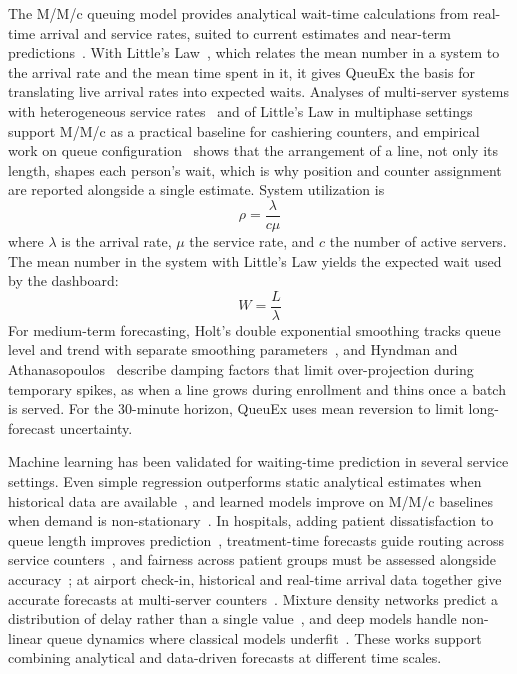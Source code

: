 \documentclass{research}
\newcommand{\sysname}{QueuEx}
\begin{document}
The M/M/c queuing model provides analytical wait-time calculations from
real-time arrival and service rates, suited to current estimates and
near-term predictions~\cite{shortle2018fundamentals}. With Little's
Law~\cite{little2008law}, which relates the mean number in a system to
the arrival rate and the mean time spent in it, it gives \sysname{} the
basis for translating live arrival rates into expected waits. Analyses
of multi-server systems with heterogeneous service
rates~\cite{rrlcomp052analysismultiserver} and of Little's Law in
multiphase settings~\cite{rrlcomp051littleformulamultiphase} support
M/M/c as a practical baseline for cashiering counters, and empirical
work on queue configuration~\cite{song2024queue} shows that the
arrangement of a line, not only its length, shapes each person's wait,
which is why position and counter assignment are reported alongside a
single estimate. System utilization is
\begin{equation}
  \rho = \frac{\lambda}{c\mu}
  \label{eq:utilization}
\end{equation}
where $\lambda$ is the arrival rate, $\mu$ the service rate, and $c$ the
number of active servers. The mean number in the system with Little's
Law yields the expected wait used by the dashboard:
\begin{equation}
  W = \frac{L}{\lambda}
  \label{eq:littles_law}
\end{equation}
For medium-term forecasting, Holt's double exponential smoothing tracks
queue level and trend with separate smoothing
parameters~\cite{holt2004forecasting}, and Hyndman and
Athanasopoulos~\cite{hyndman2021forecasting} describe damping factors
that limit over-projection during temporary spikes, as when a line grows
during enrollment and thins once a batch is served. For the 30-minute
horizon, \sysname{} uses mean reversion to limit long-forecast
uncertainty.

Machine learning has been validated for waiting-time prediction in
several service settings. Even simple regression outperforms static
analytical estimates when historical data are
available~\cite{rrlcomp015machinelearningapproach}, and learned models
improve on M/M/c baselines when demand is
non-stationary~\cite{rrlcomp009waitingtimeprediction}. In hospitals,
adding patient dissatisfaction to queue length improves
prediction~\cite{rrlcomp050dissatisfactionconsideredwaiting},
treatment-time forecasts guide routing across service
counters~\cite{rrlcomp059parallelpatienttreatment}, and fairness across
patient groups must be assessed alongside
accuracy~\cite{rrlcomp014evaluatingfairnessmachine}; at airport
check-in, historical and real-time arrival data together give accurate
forecasts at multi-server
counters~\cite{rrlcomp069machinelearningprediction}. Mixture density
networks predict a distribution of delay rather than a single
value~\cite{rrlcomp012realtimeprediction}, and deep models handle
non-linear queue dynamics where classical models
underfit~\cite{rrlcomp036deeplearningassisted}. These works support
combining analytical and data-driven forecasts at different time
scales.
\end{document}
